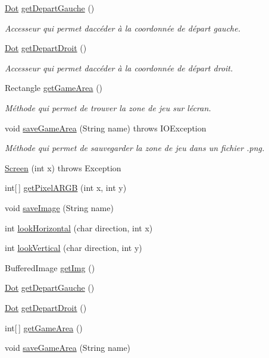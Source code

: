 \begin{DoxyCompactItemize}
\hyperlink{classSuchi_1_1Dot}{Dot} \hyperlink{classSuchi_1_1Screen_acb2af41cc729b7e9f353de7080dab4fe}{get\+Depart\+Gauche} ()
\begin{DoxyCompactList}\small\item\em Accesseur qui permet d\textquotesingle{}accéder à la coordonnée de départ gauche. \end{DoxyCompactList}\item 
\hyperlink{classSuchi_1_1Dot}{Dot} \hyperlink{classSuchi_1_1Screen_a0492df80b7a128fd2c30037f87fe8425}{get\+Depart\+Droit} ()
\begin{DoxyCompactList}\small\item\em Accesseur qui permet d\textquotesingle{}accéder à la coordonnée de départ droit. \end{DoxyCompactList}\item 
Rectangle \hyperlink{classSuchi_1_1Screen_a777f282541a58ef0b09722e978bae1a4}{get\+Game\+Area} ()
\begin{DoxyCompactList}\small\item\em Méthode qui permet de trouver la zone de jeu sur l\textquotesingle{}écran. \end{DoxyCompactList}\item 
void \hyperlink{classSuchi_1_1Screen_a6430c7ae67e0c16d288bbcf88bbdf818}{save\+Game\+Area} (String name)  throws I\+O\+Exception 
\begin{DoxyCompactList}\small\item\em Méthode qui permet de sauvegarder la zone de jeu dans un fichier .png. \end{DoxyCompactList}\item 
\hyperlink{classSuchi_1_1Screen_a2019e9c9e905dea115170dd9b83f771e}{Screen} (int x)  throws Exception 
\item 
int\mbox{[}$\,$\mbox{]} \hyperlink{classSuchi_1_1Screen_a38610a342f80da78a4e0b4c9b2ce6229}{get\+Pixel\+A\+R\+G\+B} (int x, int y)
\item 
void \hyperlink{classSuchi_1_1Screen_ac888a9c26458a7876fd78193276e95c5}{save\+Image} (String name)
\item 
int \hyperlink{classSuchi_1_1Screen_acfa20093b5fa6e0f94869b9d9463d47c}{look\+Horizontal} (char direction, int x)
\item 
int \hyperlink{classSuchi_1_1Screen_ac3e6588086a71450e6fbbe3a597c0446}{look\+Vertical} (char direction, int y)
\item 
Buffered\+Image \hyperlink{classSuchi_1_1Screen_ac79902ddea3278d98beb21cff6eb893c}{get\+Img} ()
\item 
\hyperlink{classSuchi_1_1Dot}{Dot} \hyperlink{classSuchi_1_1Screen_acb2af41cc729b7e9f353de7080dab4fe}{get\+Depart\+Gauche} ()
\item 
\hyperlink{classSuchi_1_1Dot}{Dot} \hyperlink{classSuchi_1_1Screen_a0492df80b7a128fd2c30037f87fe8425}{get\+Depart\+Droit} ()
\item 
int\mbox{[}$\,$\mbox{]} \hyperlink{classSuchi_1_1Screen_ac8dbb67509edbe53d58a462b15d64ec5}{get\+Game\+Area} ()
\item 
void \hyperlink{classSuchi_1_1Screen_a6430c7ae67e0c16d288bbcf88bbdf818}{save\+Game\+Area} (String name)
\end{DoxyCompactItemize}
